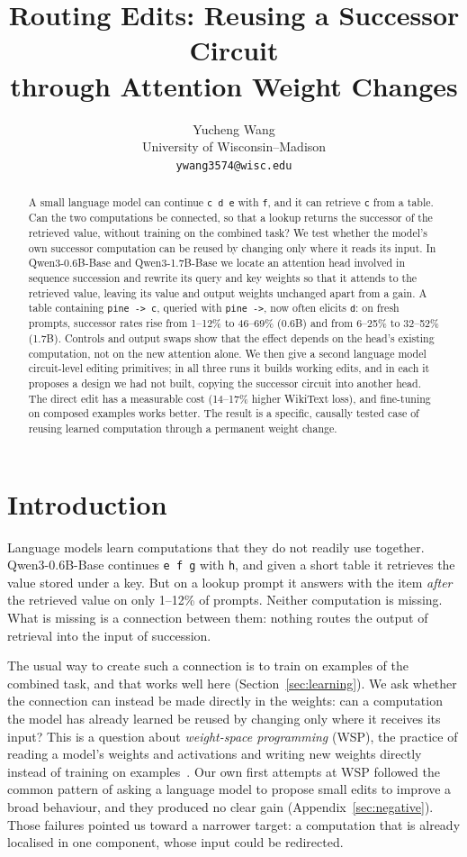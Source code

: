 \documentclass[11pt]{article}
\title{Routing Edits: Reusing a Successor Circuit\\through Attention Weight Changes}
\author{Yucheng Wang\\[3pt]
\normalsize University of Wisconsin--Madison\\
\normalsize\texttt{ywang3574@wisc.edu}}
\date{}
\begin{document}
\maketitle

\begin{abstract}
A small language model can continue \texttt{c d e} with \texttt{f}, and it can retrieve \texttt{c} from a table. Can the two computations be connected, so that a lookup returns the successor of the retrieved value, without training on the combined task? We test whether the model's own successor computation can be reused by changing only where it reads its input. In Qwen3-0.6B-Base and Qwen3-1.7B-Base we locate an attention head involved in sequence succession and rewrite its query and key weights so that it attends to the retrieved value, leaving its value and output weights unchanged apart from a gain. A table containing \texttt{pine -> c}, queried with \texttt{pine ->}, now often elicits \texttt{d}: on fresh prompts, successor rates rise from 1--12\% to 46--69\% (0.6B) and from 6--25\% to 32--52\% (1.7B). Controls and output swaps show that the effect depends on the head's existing computation, not on the new attention alone. We then give a second language model circuit-level editing primitives; in all three runs it builds working edits, and in each it proposes a design we had not built, copying the successor circuit into another head. The direct edit has a measurable cost (14--17\% higher WikiText loss), and fine-tuning on composed examples works better. The result is a specific, causally tested case of reusing learned computation through a permanent weight change.
\end{abstract}

\section{Introduction}

Language models learn computations that they do not readily use together. Qwen3-0.6B-Base continues \texttt{e f g} with \texttt{h}, and given a short table it retrieves the value stored under a key. But on a lookup prompt it answers with the item \emph{after} the retrieved value on only 1--12\% of prompts. Neither computation is missing. What is missing is a connection between them: nothing routes the output of retrieval into the input of succession.

The usual way to create such a connection is to train on examples of the combined task, and that works well here (Section~\ref{sec:learning}). We ask whether the connection can instead be made directly in the weights: can a computation the model has already learned be reused by changing only where it receives its input? This is a question about \emph{weight-space programming} (WSP), the practice of reading a model's weights and activations and writing new weights directly instead of training on examples~\cite{sparks}. Our own first attempts at WSP followed the common pattern of asking a language model to propose small edits to improve a broad behaviour, and they produced no clear gain (Appendix~\ref{sec:negative}). Those failures pointed us toward a narrower target: a computation that is already localised in one component, whose input could be redirected.
\end{document}

